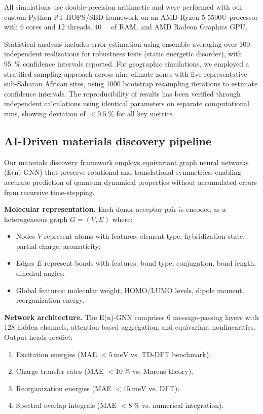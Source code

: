 All simulations use double-precision arithmetic and were performed with our custom Python PT-HOPS/SBD framework \cite{Citty2024a} on an AMD Ryzen 5 5500U processor with 6 cores and 12 threads, \SI{40}{\giga\byte} of RAM, and AMD Radeon Graphics GPU.

Statistical analysis includes error estimation using ensemble averaging over \num{100} independent realizations for robustness tests (static energetic disorder), with \SI{95}{\percent} confidence intervals reported. For geographic simulations, we employed a stratified sampling approach across nine climate zones with five representative sub-Saharan African sites, using \num{1000} bootstrap resampling iterations to estimate confidence intervals. The reproducibility of results has been verified through independent calculations using identical parameters on separate computational runs, showing deviation of $<\SI{0.5}{\percent}$ for all key metrics.

\subsection{AI-Driven materials discovery pipeline}\label{subsec:AI_Methods}

Our materials discovery framework employs equivariant graph neural networks (E(n)-GNN) that preserve rotational and translational symmetries, enabling accurate prediction of quantum dynamical properties without accumulated errors from recursive time-stepping.\cite{Zhang2024_AEM_ML}

\textbf{Molecular representation.} Each donor-acceptor pair is encoded as a heterogeneous graph $G = (V, E)$ where:
\begin{itemize}
    \item Nodes $V$ represent atoms with features: element type, hybridization state, partial charge, aromaticity;
    \item Edges $E$ represent bonds with features: bond type, conjugation, bond length, dihedral angles;
    \item Global features: molecular weight, HOMO/LUMO levels, dipole moment, reorganization energy.
\end{itemize}

\textbf{Network architecture.} The E(n)-GNN comprises 6 message-passing layers with 128 hidden channels, attention-based aggregation, and equivariant nonlinearities. Output heads predict:
\begin{enumerate}
    \item Excitation energies (MAE $<\SI{5}{\milli\electronvolt}$ vs. TD-DFT benchmark);
    \item Charge transfer rates (MAE $<\SI{10}{\percent}$ vs. Marcus theory);
    \item Reorganization energies (MAE $<\SI{15}{\milli\electronvolt}$ vs. DFT);
    \item Spectral overlap integrals (MAE $<\SI{8}{\percent}$ vs. numerical integration).
\end{enumerate}

